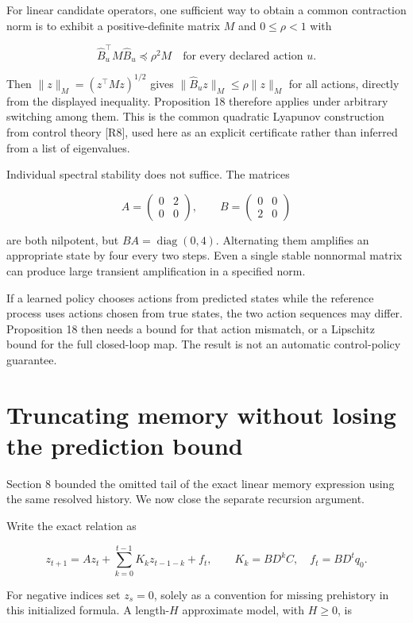 For linear candidate operators, one sufficient way to obtain a common
contraction norm is to exhibit a positive-definite matrix \(M\) and
\(0\leq\rho<1\) with

\[
\widehat B_u^\top M\widehat B_u\preceq\rho^2M
\quad\text{for every declared action }u.
\]

Then \(\|z\|_M=(z^\top Mz)^{1/2}\) gives
\(\|\widehat B_uz\|_M\leq\rho\|z\|_M\) for all actions, directly from
the displayed inequality. Proposition 18 therefore applies under
arbitrary switching among them. This is the common quadratic Lyapunov
construction from control theory {[}R8{]}, used here as an explicit
certificate rather than inferred from a list of eigenvalues.

Individual spectral stability does not suffice. The matrices

\[
A=\begin{pmatrix}0&2\\0&0\end{pmatrix},\qquad
B=\begin{pmatrix}0&0\\2&0\end{pmatrix}
\]

are both nilpotent, but \(BA=\operatorname{diag}(0,4)\). Alternating
them amplifies an appropriate state by four every two steps. Even a
single stable nonnormal matrix can produce large transient amplification
in a specified norm.

If a learned policy chooses actions from predicted states while the
reference process uses actions chosen from true states, the two action
sequences may differ. Proposition 18 then needs a bound for that action
mismatch, or a Lipschitz bound for the full closed-loop map. The result
is not an automatic control-policy guarantee.

\section{Truncating memory without losing the prediction bound}\label{LSM:truncating-memory-without-losing-the-prediction-bound}

Section 8 bounded the omitted tail of the exact linear memory expression
using the same resolved history. We now close the separate recursion
argument.

Write the exact relation as

\[
z_{t+1}=Az_t+\sum_{k=0}^{t-1}K_kz_{t-1-k}+f_t,
\qquad K_k=BD^kC,\quad f_t=BD^tq_0.
\]

For negative indices set \(z_s=0\), solely as a convention for missing
prehistory in this initialized formula. A length-\(H\) approximate
model, with \(H\geq0\), is

